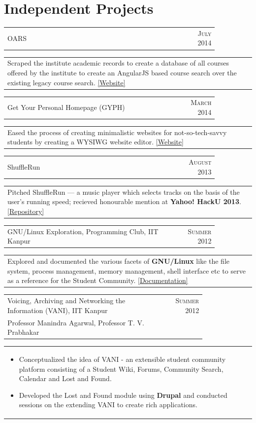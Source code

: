 \documentclass[a4paper,10pt]{article} %
\newcommand{\lproject}[4]{
    \begin{tabular}{p{0.80\linewidth}r}
        \textcolor{NavyBlue}{#2} & \multicolumn{1}{m{4cm}}{\raggedleft \textsc{#1}}\\
        #3
    \end{tabular}
    \begin{tabular}{p{\linewidth}}
    \vspace{-0.3cm}
        \footnotesize{#4}
    \end{tabular}
    \vspace{-0.5cm}
}
\newcommand{\siproject}[3]{
    \begin{tabular}{p{0.85\linewidth}r}
        \textcolor{NavyBlue}{#2} & \multicolumn{1}{m{3cm}}{\raggedleft \textsc{#1}}\\
    \end{tabular}
    \begin{tabular}{p{\linewidth}}
    \vspace{-0.3cm}
        \footnotesize{#3}
    \end{tabular}
    \vspace{-0.3cm}
}
\begin{document}
\section{Independent Projects}

\siproject {July 2014}
          {OARS}
          {
              Scraped the institute academic records to create a database of all courses offered by the institute to create an
              AngularJS based course search over the existing legacy course search.  \href{https://navya.github.io/oars}{[Website]}
           }

\siproject {March 2014}
          {Get Your Personal Homepage (GYPH)}
          {
               Eased the process of creating minimalistic websites for not-so-tech-savvy students by creating a WYSIWG website
               editor.  \href{http://gyph2.herokuapp.com/} {[Website]}
           }

\siproject {August 2013}
           {ShuffleRun}
           {
               Pitched ShuffleRun --- a music player which selects tracks on the basis of the user's running speed;
               recieved honourable mention at \textbf{Yahoo! HackU 2013}.  \href{https://github.com/srijanshetty/ShuffleRun} {[Repository]}
           }

\siproject {Summer 2012}
           {GNU/Linux Exploration, Programming Club, IIT Kanpur}
           {
              Explored and documented the various facets of \textbf{GNU/Linux} like the file system,
              process management, memory management, shell interface etc to serve as a reference for the
              Student Community.
              \href{https://docs.google.com/document/d/1ZHO9w36aoq3oaZBR4Um1AOmDfiTDAEgM6baQAu3icw4/edit?usp=sharing}{[Documentation]}
           }

\lproject {Summer 2012}
          {Voicing, Archiving and Networking the Information \textsc{(VANI)}, IIT Kanpur}
          {Professor Manindra Agarwal, Professor T. V. Prabhakar}
          {
              \begin{itemize}[leftmargin=0.5cm]
                  \item Conceptualized the idea of VANI - an extensible student community platform consisting
                      of a Student Wiki, Forums, Community Search, Calendar and Lost and Found.
                  \item Developed the Lost and Found module using \textbf{Drupal}
                      and conducted sessions on the extending VANI to create rich applications.
              \end{itemize}
          }
\end{document}
